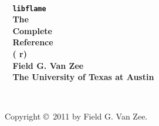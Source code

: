 \pagestyle{headings}


%
%
%
%
%
%
%
%
%

~
\vspace{1.5in}
\\
\noindent
{
\bf
\Huge
\mbox{~} \hfill {\tt libflame} \\[0.3in]
\LARGE
\mbox{~} \hfill The \\[0.255in] %
\LARGE
\mbox{~} \hfill Complete \\[0.20in]
\LARGE
\mbox{~} \hfill Reference \\[0.235in]
\LARGE
\mbox{~} \hfill ( r) \\[0.60in]
\noindent
\LARGE
\mbox{~} \hfill Field G. Van Zee \\[0.1in]
\LARGE
\mbox{~} \hfill \rm The University of Texas at Austin%
}

\pagestyle{empty}

\newpage

~
\vspace{3.4in}

\noindent
Copyright \copyright\ 2011 by Field G. Van Zee.
\vspace{0.2in}

